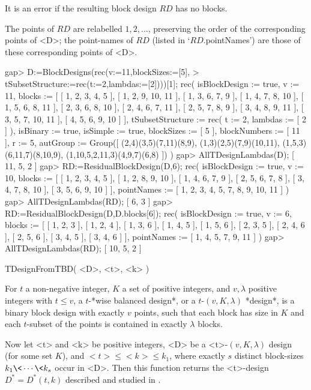 It is an error if the resulting block design $RD$ has no blocks.

The points of $RD$ are relabelled $1,2,...$, preserving the order of
the corresponding points of <D>; the point-names of $RD$ (listed in
`$RD$.pointNames') are those of these corresponding points of <D>.

\beginexample
gap> D:=BlockDesigns(rec(v:=11,blockSizes:=[5],
>       tSubsetStructure:=rec(t:=2,lambdas:=[2])))[1];
rec( isBlockDesign := true, v := 11, 
  blocks := [ [ 1, 2, 3, 4, 5 ], [ 1, 2, 9, 10, 11 ], [ 1, 3, 6, 7, 9 ], 
      [ 1, 4, 7, 8, 10 ], [ 1, 5, 6, 8, 11 ], [ 2, 3, 6, 8, 10 ], 
      [ 2, 4, 6, 7, 11 ], [ 2, 5, 7, 8, 9 ], [ 3, 4, 8, 9, 11 ], 
      [ 3, 5, 7, 10, 11 ], [ 4, 5, 6, 9, 10 ] ], 
  tSubsetStructure := rec( t := 2, lambdas := [ 2 ] ), isBinary := true, 
  isSimple := true, blockSizes := [ 5 ], blockNumbers := [ 11 ], r := 5, 
  autGroup := Group([ (2,4)(3,5)(7,11)(8,9), (1,3)(2,5)(7,9)(10,11), 
      (1,5,3)(6,11,7)(8,10,9), (1,10,5,2,11,3)(4,9,7)(6,8) ]) )
gap> AllTDesignLambdas(D);      
[ 11, 5, 2 ]
gap> RD:=ResidualBlockDesign(D,6);
rec( isBlockDesign := true, v := 10, 
  blocks := [ [ 1, 2, 3, 4, 5 ], [ 1, 2, 8, 9, 10 ], [ 1, 4, 6, 7, 9 ], 
      [ 2, 5, 6, 7, 8 ], [ 3, 4, 7, 8, 10 ], [ 3, 5, 6, 9, 10 ] ], 
  pointNames := [ 1, 2, 3, 4, 5, 7, 8, 9, 10, 11 ] )
gap> AllTDesignLambdas(RD);
[ 6, 3 ]
gap> RD:=ResidualBlockDesign(D,D.blocks[6]);
rec( isBlockDesign := true, v := 6, 
  blocks := [ [ 1, 2, 3 ], [ 1, 2, 4 ], [ 1, 3, 6 ], [ 1, 4, 5 ], 
      [ 1, 5, 6 ], [ 2, 3, 5 ], [ 2, 4, 6 ], [ 2, 5, 6 ], [ 3, 4, 5 ], 
      [ 3, 4, 6 ] ], pointNames := [ 1, 4, 5, 7, 9, 11 ] )
gap> AllTDesignLambdas(RD);
[ 10, 5, 2 ]
\endexample 



\>TDesignFromTBD( <D>, <t>, <k> )

For $t$ a non-negative integer, $K$ a set of positive integers, and
$v,\lambda$ positive integers with $t\le v$, a $t$-*wise balanced design*,
or a $t$-$(v,K,\lambda)$ *design*, is a binary block design with exactly
$v$ points, such that each block has size in $K$ and each $t$-subset of
the points is contained in exactly $\lambda$ blocks.

Now let <t> and <k> be positive integers, <D> be a <t>-$(v,K,\lambda)$
design (for some set $K$), and $<t>\le <k>\le k_1$, where exactly $s$
distinct block-sizes $k_1\< \cdots \< k_s$ occur in <D>. Then this
function returns the <t>-design $D^{*}=D^{*}(t,k)$ described and studied
in \cite{McSo}.

